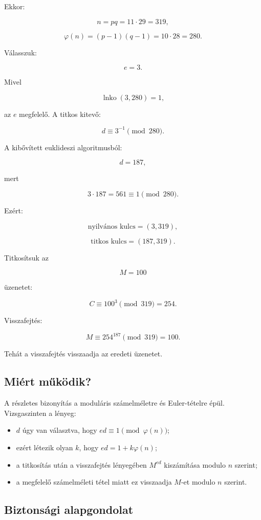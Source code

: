 Ekkor:

\[
n=pq=11\cdot29=319,
\]

\[
\varphi(n)=(p-1)(q-1)=10\cdot28=280.
\]

Válasszuk:

\[
e=3.
\]

Mivel

\[
\operatorname{lnko}(3,280)=1,
\]

az $e$ megfelelő. A titkos kitevő:

\[
d\equiv3^{-1}\pmod{280}.
\]

A kibővített euklideszi algoritmusból:

\[
d=187,
\]

mert

\[
3\cdot187=561\equiv1\pmod{280}.
\]

Ezért:

\[
\text{nyilvános kulcs}=(3,319),
\]

\[
\text{titkos kulcs}=(187,319).
\]

Titkosítsuk az

\[
M=100
\]

üzenetet:

\[
C\equiv100^3\pmod{319}=254.
\]

Visszafejtés:

\[
M\equiv254^{187}\pmod{319}=100.
\]

Tehát a visszafejtés visszaadja az eredeti üzenetet.

\subsection{Miért működik?}

A részletes bizonyítás a moduláris számelméletre és Euler-tételre épül. Vizsgaszinten a lényeg:

\begin{itemize}
  \item $d$ úgy van választva, hogy $ed\equiv1\pmod{\varphi(n)}$;
  \item ezért létezik olyan $k$, hogy $ed=1+k\varphi(n)$;
  \item a titkosítás után a visszafejtés lényegében $M^{ed}$ kiszámítása modulo $n$ szerint;
  \item a megfelelő számelméleti tétel miatt ez visszaadja $M$-et modulo $n$ szerint.
\end{itemize}

\subsection{Biztonsági alapgondolat}

